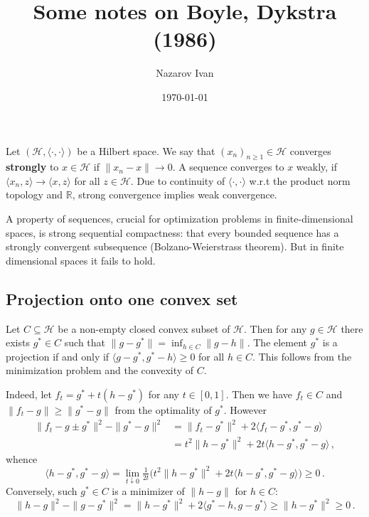 \documentclass[a4paper]{article}
\title{Some notes on Boyle, Dykstra (1986)}
\author{Nazarov Ivan}
\date{\today}
\newcommand{\Hcal}{\mathcal{H}}
\newcommand{\real}{\mathbb{R}}
\begin{document}
\maketitle

Let $(\Hcal, \langle\cdot,\cdot\rangle)$ be a Hilbert space. We say that $(x_n)_{n\geq1} 
\in \Hcal$ converges {\bf strongly} to $x\in\Hcal$ if $\|x_n - x\| \to 0$. A sequence 
converges to $x$ weakly, if $\langle x_n, z \rangle \to \langle x, z\rangle$ for all
$z\in \Hcal$. Due to continuity of $\langle\cdot,\cdot\rangle$ w.r.t the product norm
topology and $\real$, strong convergence implies weak convergence.

A property of sequences, crucial for optimization problems in finite-dimensional spaces,
is strong sequential compactness: that every bounded sequence has a strongly convergent
subsequence (Bolzano-Weierstrass theorem). But in finite dimensional spaces it fails to
hold.

\subsection*{Projection onto one convex set} %
\label{sub:projection_onto_one_convex_set}

Let $C \subseteq \Hcal$ be a non-empty closed convex subset of $\Hcal$. Then for any
$g\in \Hcal$ there exists $g^*\in C$ such that $\|g - g^*\| = \inf_{h\in C} \|g - h\|$.
The element $g^*$ is a projection if and only if $\langle g - g^*, g^* - h\rangle
\geq 0$ for all $h \in C$. This follows from the minimization problem and the convexity
of $C$.

Indeed, let $f_t = g^* + t (h - g ^*)$ for any $t \in [0, 1]$. Then we have $f_t \in C$
and $\|f_t - g\| \geq \|g^* - g\|$ from the optimality of $g^*$. However
\begin{align*}
  \|f_t - g \pm g^*\|^2 - \|g^* - g\|^2
    &= \|f_t - g^*\|^2 + 2 \langle f_t - g^*, g^* - g\rangle
    \\
    &= t^2 \|h - g^*\|^2 + 2 t \langle h - g^*, g^* - g\rangle
    \,,
\end{align*}
whence
\begin{equation} \label{eq:proj_prop}
  \langle h - g^*, g^* - g\rangle
    = \lim_{t \downarrow 0}
      \tfrac1{2 t} \bigl( t^2 \|h - g^*\|^2 + 2 t \langle h - g^*, g^* - g\rangle \bigr)
      \geq 0
      \,.
\end{equation}
Conversely, such $g^*\in C$ is a minimizer of $\|h - g\|$ for $h \in C$:
\begin{equation*}
  \|h - g\|^2 - \|g - g^*\|^2
    = \|h - g^*\|^2 + 2 \langle g^* - h, g - g^*\rangle
    \geq \|h - g^*\|^2 \geq 0
    \,.
\end{equation*}
\end{document}
